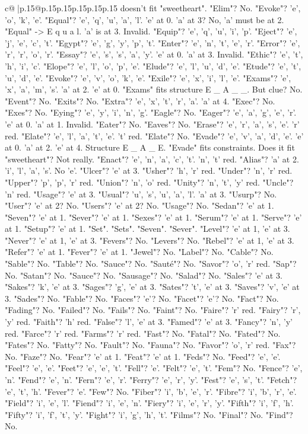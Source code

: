 \documentclass{article}
\begin{document}
{\begin{supertabular}{c@{$\;$}|p{.15\linewidth}@{}p{.15\linewidth}p{.15\linewidth}p{.15\linewidth}p{.15\linewidth}p{.15\linewidth}}
{{{doesn't fit "sweetheart". "Elim"? No. "Evoke"? 'e', 'o', 'k', 'e'. "Equal"? 'e', 'q', 'u', 'a', 'l'. 'e' at 0. 'a' at 3? No, 'a' must be at 2. "Equal" {-}> E q u a l. 'a' is at 3. Invalid. "Equip"? 'e', 'q', 'u', 'i', 'p'. "Eject"? 'e', 'j', 'e', 'c', 't'. "Egypt"? 'e', 'g', 'y', 'p', 't'. "Enter"? 'e', 'n', 't', 'e', 'r'. "Error"? 'e', 'r', 'r', 'o', 'r'. "Essay"? 'e', 's', 's', 'a', 'y'. 'e' at 0. 'a' at 3. Invalid. "Ethic"? 'e', 't', 'h', 'i', 'c'. "Elope"? 'e', 'l', 'o', 'p', 'e'. "Elude"? 'e', 'l', 'u', 'd', 'e'. "Etude"? 'e', 't', 'u', 'd', 'e'. "Evoke"? 'e', 'v', 'o', 'k', 'e'. "Exile"? 'e', 'x', 'i', 'l', 'e'. "Exams"? 'e', 'x', 'a', 'm', 's'. 'a' at 2. 'e' at 0. "Exams" fits structure E \_ A \_ \_. But clue? No. "Event"? No. "Exits"? No. "Extra"? 'e', 'x', 't', 'r', 'a'. 'a' at 4. "Exec"? No. "Exes"? No. "Eying"? 'e', 'y', 'i', 'n', 'g'. "Eagle"? No. "Eager"? 'e', 'a', 'g', 'e', 'r'. 'e' at 0. 'a' at 1. Invalid. "Eater"? No. "Eaves"? No. "Erase"? 'e', 'r', 'a', 's', 'e'. 'r' red. "Elate"? 'e', 'l', 'a', 't', 'e'. 't' red. "Elate"? No. "Evade"? 'e', 'v', 'a', 'd', 'e'. 'e' at 0. 'a' at 2. 'e' at 4. Structure E \_ A \_ E. "Evade" fits constraints. Does it fit "sweetheart"? Not really. "Enact"? 'e', 'n', 'a', 'c', 't'. 'n', 't' red. "Alias"? 'a' at 2. 'i', 'l', 'a', 's'. No 'e'. "Ulcer"? 'e' at 3. "Usher"? 'h', 'r' red. "Under"? 'n', 'r' red. "Upper"? 'p', 'p', 'r' red. "Union"? 'n', 'o' red. "Unity"? 'n', 't', 'y' red. "Uncle"? 'n' red. "Usage"? 'e' at 3. "Usual"? 'u', 's', 'u', 'a', 'l'. 'a' at 3. "Usurp"? No. "User"? 'e' at 2? No. "Users"? 'e' at 2? No. "Usage"? No. "Sedan"? 'e' at 1. "Seven"? 'e' at 1. "Sever"? 'e' at 1. "Sexes"? 'e' at 1. "Serum"? 'e' at 1. "Serve"? 'e' at 1. "Setup"? 'e' at 1. "Set". "Sets". "Seven". "Sever". "Level"? 'e' at 1, 'e' at 3. "Never"? 'e' at 1, 'e' at 3. "Fevers"? No. "Levers"? No. "Rebel"? 'e' at 1, 'e' at 3. "Refer"? 'e' at 1. "Fever"? 'e' at 1. "Jewel"? No. "Label"? No. "Cable"? No. "Sable"? No. "Table"? No. "Sauce"? No. "Sauté"? No. "Savor"? 'o', 'r' red. "Sap"? No. "Satan"? No. "Sauce"? No. "Sausage"? No. "Salad"? No. "Sales"? 'e' at 3. "Sakes"? 'k', 'e' at 3. "Sages"? 'g', 'e' at 3. "Sates"? 't', 'e' at 3. "Saves"? 'v', 'e' at 3. "Sades"? No. "Fable"? No. "Faces"? 'e'? No. "Facet"? 'e'? No. "Fact"? No. "Fading"? No. "Failed"? No. "Fails"? No. "Faint"? No. "Faire"? 'r' red. "Fairy"? 'r', 'y' red. "Faith"? 'h' red. "False"? 'l', 'e' at 3. "Famed"? 'e' at 3. "Fancy"? 'n', 'y' red. "Farce"? 'r' red. "Farms"? 'r' red. "Fast"? No. "Fatal"? No. "Fated"? No. "Fates"? No. "Fatty"? No. "Fault"? No. "Fauna"? No. "Favor"? 'o', 'r' red. "Fax"? No. "Faze"? No. "Fear"? 'e' at 1. "Feat"? 'e' at 1. "Feds"? No. "Feed"? 'e', 'e'. "Feel"? 'e', 'e'. "Feet"? 'e', 'e', 't'. "Fell"? 'e'. "Felt"? 'e', 't'. "Fem"? No. "Fence"? 'e', 'n'. "Fend"? 'e', 'n'. "Fern"? 'e', 'r'. "Ferry"? 'e', 'r', 'y'. "Fest"? 'e', 's', 't'. "Fetch"? 'e', 't', 'h'. "Fever"? 'e'. "Few"? No. "Fiber"? 'i', 'b', 'e', 'r'. "Fibre"? 'i', 'b', 'r', 'e'. "Field"? 'i', 'e', 'l'. "Fiend"? 'i', 'e', 'n'. "Fiery"? 'i', 'e', 'r', 'y'. "Fifth"? 'i', 'f', 'h'. "Fifty"? 'i', 'f', 't', 'y'. "Fight"? 'i', 'g', 'h', 't'. "Films"? No. "Final"? No. "Find"? No. }}}
\end{supertabular}}
\end{document}
